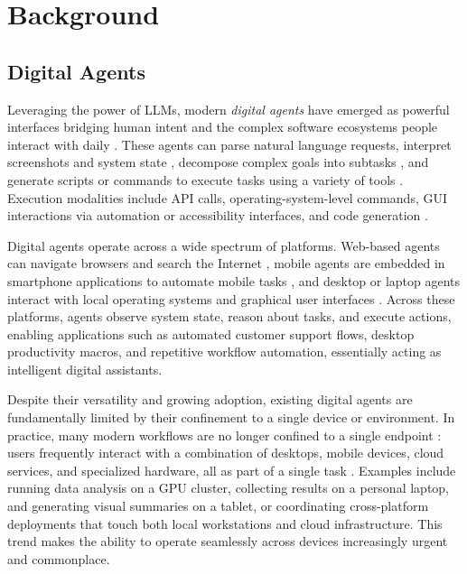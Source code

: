 \documentclass[10pt]{article} %
\begin{document}
\section{Background}
\label{sec:background}

\subsection{Digital Agents}
\label{sec:background:agents}

Leveraging the power of LLMs, modern \emph{digital agents} have emerged as powerful interfaces bridging human intent and the complex software ecosystems people interact with daily \cite{zhang2024large}. These agents can parse natural language requests, interpret screenshots and system state \cite{zheng2025vem, wu2025gui, zhao2025learning}, decompose complex goals into subtasks \cite{huang2024understanding}, and generate scripts or commands to execute tasks using a variety of tools \cite{wang2024survey}. Execution modalities include API calls, operating-system-level commands, GUI interactions via automation or accessibility interfaces, and code generation \cite{zhang2025api, qiao2023taskweaver, wang2024large, zhang2025swe}.

Digital agents operate across a wide spectrum of platforms. Web-based agents can navigate browsers and search the Internet \cite{ning2025survey, zheng2024gpt}, mobile agents are embedded in smartphone applications to automate mobile tasks \cite{zhang2025appagent, wang2024mobile}, and desktop or laptop agents interact with local operating systems and graphical user interfaces \cite{zhang2025ufo, zhang2025ufo2}. Across these platforms, agents observe system state, reason about tasks, and execute actions, enabling applications such as automated customer support flows, desktop productivity macros, and repetitive workflow automation, essentially acting as intelligent digital assistants.

Despite their versatility and growing adoption, existing digital agents are fundamentally limited by their confinement to a single device or environment. In practice, many modern workflows are no longer confined to a single endpoint \cite{brudy2018investigating}: users frequently interact with a combination of desktops, mobile devices, cloud services, and specialized hardware, all as part of a single task \cite{xu2021cross, chen2020multi}. Examples include running data analysis on a GPU cluster, collecting results on a personal laptop, and generating visual summaries on a tablet, or coordinating cross-platform deployments that touch both local workstations and cloud infrastructure. This trend makes the ability to operate seamlessly across devices increasingly urgent and commonplace.
\end{document}
